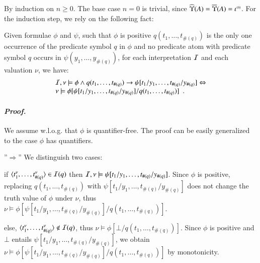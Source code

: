 By induction on $n\geq0$. The base case $n=0$ is trivial, since
$\widehat{\Upsilon}({A}) = \overline{\Upsilon}({A}) = {\iota}^{\scriptscriptstyle{({0})}}$. For the induction
step, we rely on the following fact:

 \begin{fact}\label{fact:subst}
   Given formulae $\phi$ and $\psi$, such that $\phi$ is positive
   $q(t_1,\ldots,t_{\#(q)})$ is the only one occurrence of the
   predicate symbol $q$ in $\phi$ and no predicate atom with
   predicate symbol $q$ occurs in $\psi(y_1,\ldots,y_{\#(q)})$, for
   each interpretation $\mathcal{I}$ and each valuation $\nu$, we have:
   \[\begin{array}{l} 
   \mathcal{I},\nu \models \phi \wedge q(t_1,\ldots,t_{\#(q)}) \rightarrow
   \psi[t_1/y_1,\ldots,t_{\#(q)}/y_{\#(q)}] \Leftrightarrow \\ \nu \models
   \phi[\psi[t_1/y_1,\ldots,t_{\#(q)}/y_{\#(q)}]/q(t_1,\ldots,t_{\#(q)})]\enspace.
   \end{array}\]
 \end{fact}

 \paragraph{\em Proof.}
 We assume w.l.o.g. that $\phi$ is quantifier-free. The proof can be
 easily generalized to the case $\phi$ has quantifiers.

 \noindent''$\Rightarrow$'' 
    We distinguish two cases: \begin{compactitem}
    \item if $\langle t_1^\nu, \ldots, t_{\#(q)}^\nu \rangle \in \mathcal{I}(q)$ then
      $\mathcal{I},\nu \models \psi[t_1/y_1,\ldots,t_{\#(q)}/y_{\#(q)}]$. Since
      $\phi$ is positive, replacing $q(t_1,\ldots,t_{\#(q)})$ with
      $\psi[t_1/y_1,\ldots,t_{\#(q)}/y_{\#(q)}]$ does not change the
      truth value of $\phi$ under $\nu$, thus $\nu \models
      \phi[\psi[t_1/y_1,\ldots,t_{\#(q)}/y_{\#(q)}]/q(t_1,\ldots,t_{\#(q)})]$.
    \item else, $\langle t_1^\nu, \ldots, t_{\#(q)}^\nu \rangle \not\in
      \mathcal{I}(q)$, thus $\nu \models
      \phi[\bot/q(t_1,\ldots,t_{\#(q)})]$. Since $\phi$ is positive
      and $\bot$ entails $\psi[t_1/y_1,\ldots,t_{\#(q)}/y_{\#(q)}]$,
      we obtain $\nu \models
      \phi[\psi[t_1/y_1,\ldots,t_{\#(q)}/y_{\#(q)}]/q(t_1,\ldots,t_{\#(q)})]$
      by monotonicity. 
    \end{compactitem}

